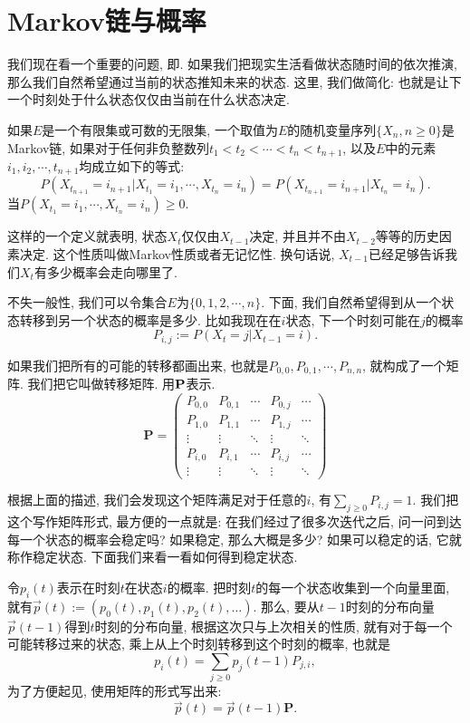 \section{Markov链与概率}

我们现在看一个重要的问题, 即. 如果我们把现实生活看做状态随时间的依次推演, 那么我们自然希望通过当前的状态推知未来的状态. 这里, 我们做简化: 也就是让下一个时刻处于什么状态仅仅由当前在什么状态决定. 

\begin{definition}
    如果$E$是一个有限集或可数的无限集, 一个取值为$E$的随机变量序列$\{X_n,n\geq 0\}$是Markov链, 如果对于任何非负整数列$t_1< t_2< \cdots< t_{n}<t_{n+1}$, 以及$E$中的元素$i_1, i_2, \cdots , t_{n+1}$均成立如下的等式: 
    $$
    P(X_{t_{n+1}}=i_{n+1} | X_{t_1}=i_1, \cdots, X{_{t_n}}=i_n)=P(X_{t_{n+1}}=i_{n+1}|X_{t_n}=i_n).
    $$
    当$P(X_{t_1}=i_1, \cdots, X_{t_n}=i_n)\geq 0$. 
\end{definition}

这样的一个定义就表明, 状态$X_t$仅仅由$X_{t-1}$决定, 并且并不由$X_{t-2}$等等的历史因素决定. 这个性质叫做Markov性质或者无记忆性. 换句话说, $X_{t-1}$已经足够告诉我们$X_t$有多少概率会走向哪里了. 

不失一般性, 我们可以令集合$E$为$\{0,1,2,\cdots, n\}$. 下面, 我们自然希望得到从一个状态转移到另一个状态的概率是多少. 比如我现在在$i$状态, 下一个时刻可能在$j$的概率
$$
P_{i,j}:=P(X_t=j|X_{t-1}=i).
$$

如果我们把所有的可能的转移都画出来, 也就是$P_{0,0}, P_{0,1}, \cdots, P_{n,n}$, 就构成了一个矩阵. 我们把它叫做转移矩阵. 用$\bf P$表示.
$$
\mathbf{P}=\left(\begin{array}{ccccc}P_{0,0} & P_{0,1} & \cdots & P_{0, j} & \cdots \\ P_{1,0} & P_{1,1} & \cdots & P_{1, j} & \cdots \\ \vdots & \vdots & \ddots & \vdots & \ddots \\ P_{i, 0} & P_{i, 1} & \cdots & P_{i, j} & \cdots \\ \vdots & \vdots & \ddots & \vdots & \ddots\end{array}\right)
$$

根据上面的描述, 我们会发现这个矩阵满足对于任意的$i$, 有$\sum_{j\geq 0}P_{i,j}=1$. 我们把这个写作矩阵形式, 最方便的一点就是: 在我们经过了很多次迭代之后, 问一问到达每一个状态的概率会稳定吗? 如果稳定, 那么大概是多少? 如果可以稳定的话, 它就称作稳定状态. 下面我们来看一看如何得到稳定状态. 

令$p_i(t)$表示在时刻$t$在状态$i$的概率. 把时刻$t$的每一个状态收集到一个向量里面, 就有$\vec{p}(t):=\left(p_0(t), p_1(t), p_2(t), \ldots\right)$. 那么, 要从$t-1$时刻的分布向量$\vec{p}(t-1)$得到$t$时刻的分布向量, 根据这次只与上次相关的性质, 就有对于每一个可能转移过来的状态, 乘上从上个时刻转移到这个时刻的概率, 也就是$$p_i(t)=\sum_{j \geq 0} p_j(t-1) P_{j, i},$$ 为了方便起见, 使用矩阵的形式写出来: $$\vec{p}(t)=\vec{p}(t-1) \mathbf{P}.$$

